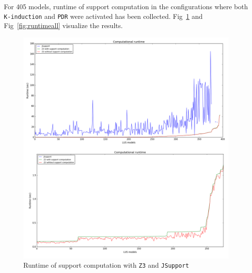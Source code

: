 For 405 models, runtime of support computation in the configurations where both \texttt{K-induction} and \texttt{PDR} were activated has been collected. Fig~\ref{fig:runtimez3} and Fig~\ref{fig:runtimeall} visualize the results.

\begin{figure}
  \centering
  \includegraphics[width=\textwidth]{figs/runtimeZ3.png}
  \caption{\small{Runtime of support computation with \texttt{Z3} and \texttt{JSupport}}}\label{fig:runtimez3}
\end{figure}

